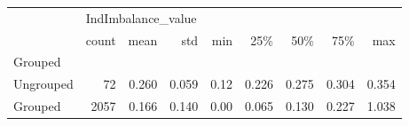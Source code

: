 \begin{tabular}{lrrrrrrrr}
\toprule
{} & \multicolumn{8}{l}{IndImbalance\_value} \\
{} &              count &   mean &    std &   min &    25\% &    50\% &    75\% &    max \\
Grouped   &                    &        &        &       &        &        &        &        \\
\midrule
Ungrouped &                 72 &  0.260 &  0.059 &  0.12 &  0.226 &  0.275 &  0.304 &  0.354 \\
Grouped   &               2057 &  0.166 &  0.140 &  0.00 &  0.065 &  0.130 &  0.227 &  1.038 \\
\bottomrule
\end{tabular}
